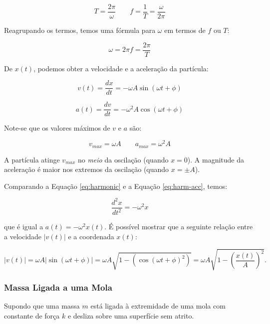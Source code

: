 \begin{equation}
    T=\frac{2\pi}{\omega} \qquad f=\frac{1}{T}=\frac{\omega}{2\pi}
\end{equation}

Reagrupando os termos, temos uma fórmula para $\omega$ em termos de $f$ ou $T$:

\begin{equation}
    \omega=2\pi f=\frac{2\pi}{T}
\end{equation}

De $x(t)$, podemos obter a velocidade e a aceleração da partícula:

\begin{equation}
    v(t)=\frac{dx}{dt}=-\omega A\sin(\omega t+\phi)
\end{equation}

\begin{equation}\label{eq:harm-acc}
    a(t)=\frac{dv}{dt}=-\omega^2A\cos(\omega t + \phi)
\end{equation}

Note-se que os valores máximos de $v$ e $a$ são:

\begin{equation}
    v_{max}=\omega A \qquad a_{max}=\omega^2A
\end{equation}

A partícula atinge $v_{max}$ no \emph{meio} da oscilação (quando $x=0$). A magnitude da aceleração é maior nos extremos da oscilação (quando $x=\pm A$).

Comparando a Equação \ref{eq:harmonic} e a Equação \ref{eq:harm-acc}, temos:

\begin{equation}\label{eq:osc-massa-pos-1}
    \frac{d^2x}{dt^2}=-\omega^2x
\end{equation}

que é igual a $a(t)=-\omega^2x(t)$. É possível mostrar que a seguinte relação entre a velocidade $|v(t)|$ e a coordenada $x(t)$:

\begin{equation}
    |v(t)|=\omega A|\sin(\omega t+\phi)|=
    \omega A \sqrt{1-(\cos(\omega t + \phi)^2)}=\omega A\sqrt{1-(\frac{x(t)}{A})^2}.
\end{equation}

\subsubsection{Massa Ligada a uma Mola}
Supondo que uma massa $m$ está ligada à extremidade de uma mola com constante de força $k$ e desliza sobre uma superfície sem atrito.


